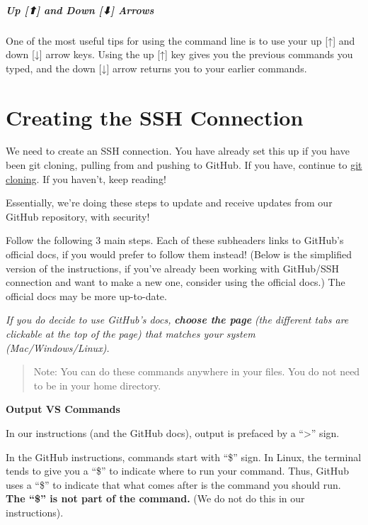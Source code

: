 \documentclass[
]{book}
\newenvironment{bluebox}{
  \definecolor{shadecolor}{RGB}{172, 210, 237}
  \color{white}
  \begin{shaded}}
 {\end{shaded}}
\theoremstyle{definition}
\theoremstyle{definition}
\theoremstyle{definition}
\theoremstyle{definition}
\theoremstyle{remark}
\begin{document}
\subparagraph*{Up {[}⬆{]} and Down {[}⬇{]} Arrows}\label{up-and-down-arrows}

One of the most useful tips for using the command line is to use your up {[}↑{]} and down {[}↓{]} arrow keys. Using the up {[}↑{]} key gives you the previous commands you typed, and the down {[}↓{]} arrow returns you to your earlier commands.

\section{Creating the SSH Connection}\label{creating-the-ssh-connection}

We need to create an SSH connection. You have already set this up if you have been git cloning, pulling from and pushing to GitHub. If you have, continue to \hyperref[git-clone]{git cloning}. If you haven't, keep reading!

Essentially, we're doing these steps to update and receive updates from our GitHub repository, with security!

Follow the following 3 main steps. Each of these subheaders links to GitHub's official docs, if you would prefer to follow them instead! (Below is the simplified version of the instructions, if you've already been working with GitHub/SSH connection and want to make a new one, consider using the official docs.) The official docs may be more up-to-date.

\emph{If you do decide to use GitHub's docs,} \textbf{\emph{choose the page}} \emph{(the different tabs are clickable at the top of the page) that matches your system (Mac/Windows/Linux).}

\begin{quote}
Note: You can do these commands anywhere in your files. You do not need to be in your home directory.
\end{quote}

\begin{bluebox}

\begin{center}
\textbf{Output VS Commands}

\end{center}

In our instructions (and the GitHub docs), output is prefaced by a ``\textgreater{}'' sign.

In the GitHub instructions, commands start with ``\$'' sign. In Linux, the terminal tends to give you a ``\$'' to indicate where to run your command. Thus, GitHub uses a ``\$'' to indicate that what comes after is the command you should run. \textbf{The ``\$'' is not part of the command.} (We do not do this in our instructions).

\end{bluebox}
\end{document}
